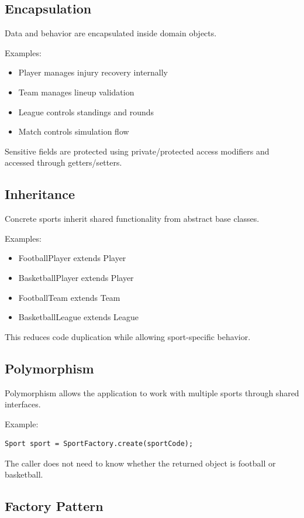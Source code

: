 \documentclass[11pt,a4paper]{article}
\begin{document}
\subsection{Encapsulation}

Data and behavior are encapsulated inside domain objects.

Examples:
\begin{itemize}
\item Player manages injury recovery internally
\item Team manages lineup validation
\item League controls standings and rounds
\item Match controls simulation flow
\end{itemize}

Sensitive fields are protected using private/protected access modifiers and accessed through getters/setters.

\subsection{Inheritance}

Concrete sports inherit shared functionality from abstract base classes.

Examples:
\begin{itemize}
\item FootballPlayer extends Player
\item BasketballPlayer extends Player
\item FootballTeam extends Team
\item BasketballLeague extends League
\end{itemize}

This reduces code duplication while allowing sport-specific behavior.

\subsection{Polymorphism}

Polymorphism allows the application to work with multiple sports through shared interfaces.

Example:
\begin{verbatim}
Sport sport = SportFactory.create(sportCode);
\end{verbatim}

The caller does not need to know whether the returned object is football or basketball.

\subsection{Factory Pattern}
\end{document}
